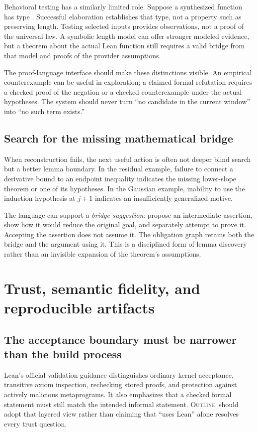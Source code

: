 \documentclass[11pt,a4paper]{article}
\newcommand{\Outline}{\textsc{Outline}}
\theoremstyle{definition}
\theoremstyle{remark}
\numberwithin{equation}{section}
\begin{document}
Behavioral testing has a similarly limited role. Suppose a synthesized function has type \texttt{}. Successful elaboration establishes that type, not a property such as preserving length. Testing selected inputs provides observations, not a proof of the universal law. A symbolic length model can offer stronger modeled evidence, but a theorem about the actual Lean function still requires a valid bridge from that model and proofs of the provider assumptions.

The proof-language interface should make these distinctions visible. An empirical counterexample can be useful in exploration; a claimed formal refutation requires a checked proof of the negation or a checked counterexample under the actual hypotheses. The system should never turn ``no candidate in the current window'' into ``no such term exists.''

\subsection{Search for the missing mathematical bridge}
When reconstruction fails, the next useful action is often not deeper blind search but a better lemma boundary. In the residual example, failure to connect a derivative bound to an endpoint inequality indicates the missing lower-slope theorem or one of its hypotheses. In the Gaussian example, inability to use the induction hypothesis at $j+1$ indicates an insufficiently generalized motive.

The language can support a \emph{bridge suggestion}: propose an intermediate assertion, show how it would reduce the original goal, and separately attempt to prove it. Accepting the assertion does not assume it. The obligation graph retains both the bridge and the argument using it. This is a disciplined form of lemma discovery rather than an invisible expansion of the theorem's assumptions.

\section{Trust, semantic fidelity, and reproducible artifacts}
\label{sec:trust}
\subsection{The acceptance boundary must be narrower than the build process}
Lean's official validation guidance distinguishes ordinary kernel acceptance, transitive axiom inspection, rechecking stored proofs, and protection against actively malicious metaprograms. It also emphasizes that a checked formal statement must still match the intended informal statement.\cite{lean-validation} \Outline\ should adopt that layered view rather than claiming that ``uses Lean'' alone resolves every trust question.
\end{document}
